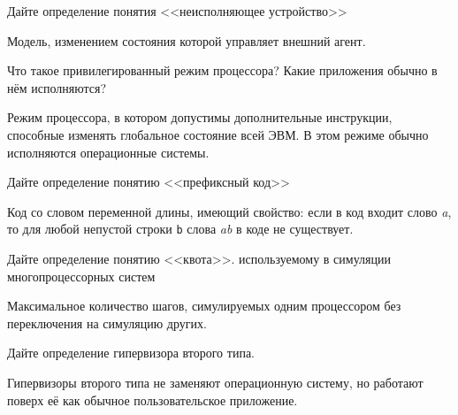 \documentclass[a4paper, addpoints, answers]{exam}
\begin{document}
\begin{questions}
\question[3] Дайте определение понятия <<неисполняющее устройство>>
\begin{solution}[2cm]
Модель, изменением состояния которой управляет внешний агент.
\end{solution}

\question[3] Что такое привилегированный режим процессора? Какие приложения обычно в нём исполняются?
\begin{solution}[2cm]
Режим процессора, в котором допустимы дополнительные инструкции, способные изменять глобальное состояние всей ЭВМ. В этом режиме обычно исполняются операционные системы.
\end{solution}

\question[3] Дайте определение понятию <<префиксный код>>
\begin{solution}[1cm]
Код со словом переменной длины, имеющий свойство: если в код входит слово \textit{a}, то для любой непустой строки \texttt{b} слова \textit{ab} в коде не существует. 
\end{solution}


\question[3] Дайте определение понятию <<квота>>. используемому в симуляции многопроцессорных систем
\begin{solution}[1cm]
Максимальное количество шагов, симулируемых одним процессором без переключения на симуляцию других.
\end{solution}

\question[3] Дайте определение гипервизора второго типа.
\begin{solution}[2cm]
Гипервизоры второго типа  не заменяют операционную систему, но работают поверх её как обычное пользовательское приложение.
\end{solution}


    



\end{questions}
\end{document}
